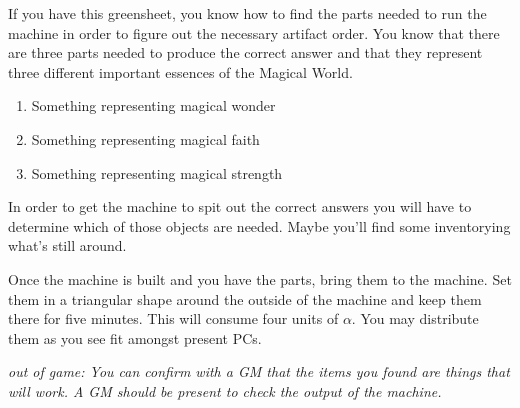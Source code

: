\documentclass[green]{guildcamp3}
\begin{document}
\name{\gAddPartsMagic{}}


If you have this greensheet, you know how to find the parts needed to run the machine in order to figure out the necessary artifact order. You know that there are three parts needed to produce the correct answer and that they represent three different important essences of the Magical World.

\begin{enumerate}
	\item Something representing magical wonder
	\item Something representing magical faith
	\item Something representing magical strength
\end{enumerate}

In order to get the machine to spit out the correct answers you will have to determine which of those objects are needed. Maybe you'll find some inventorying what's still around. 

Once the machine is built and you have the parts, bring them to the machine. Set them in a triangular shape around the outside of the machine and keep them there for five minutes. This will consume four units of $\alpha$. You may distribute them as you see fit amongst present PCs.

\emph{out of game: You can confirm with a GM that the items you found are things that will work. A GM should be present to check the output of the machine.}


\end{document}
